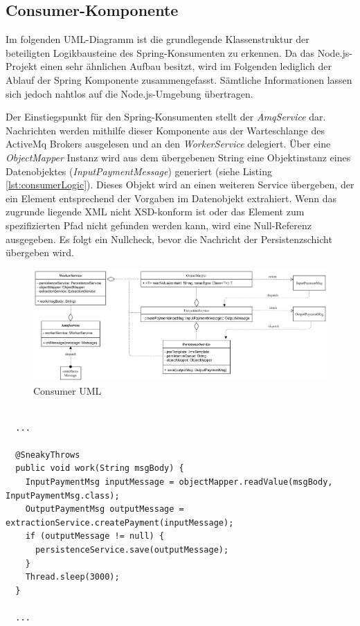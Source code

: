 \subsection{Consumer-Komponente}

Im folgenden UML-Diagramm ist die grundlegende Klassenstruktur der beteiligten Logikbausteine des Spring-Konsumenten zu erkennen. Da das Node.js-Projekt einen sehr ähnlichen Aufbau besitzt, wird im Folgenden lediglich der Ablauf der Spring Komponente zusammengefasst. Sämtliche Informationen lassen sich jedoch nahtlos auf die Node.js-Umgebung übertragen. 

Der Einstiegspunkt für den Spring-Konsumenten stellt der \emph{AmqService} dar. Nachrichten werden mithilfe dieser Komponente aus der Warteschlange des ActiveMq Brokers ausgelesen und an den \emph{WorkerService} delegiert. Über eine \emph{ObjectMapper} Instanz wird aus dem übergebenen String eine Objektinstanz eines Datenobjektes (\emph{InputPaymentMessage}) generiert (siehe Listing \ref{lst:consumerLogic}). Dieses Objekt wird an einen weiteren Service übergeben, der ein Element entsprechend der Vorgaben im Datenobjekt extrahiert. Wenn das zugrunde liegende XML nicht XSD-konform ist oder das Element zum spezifizierten Pfad nicht gefunden werden kann, wird eine Null-Referenz ausgegeben. Es folgt ein Nullcheck, bevor die Nachricht der Persistenzschicht übergeben wird.

\begin{figure}[b!]
	\centering
	\includegraphics[width=\linewidth]{kapitel/problemloesung/implementierung/_img/consumer-uml}
	\caption[Consumer UML]{Consumer UML}
	\label{fig:consumerUml}
\end{figure}

\begin{minipage}{\linewidth}
\begin{lstlisting}[style=javaStyle,caption={WorkerService - Consumer Logik},label=lst:consumerLogic]

  ...

  @SneakyThrows
  public void work(String msgBody) {
    InputPaymentMsg inputMessage = objectMapper.readValue(msgBody, InputPaymentMsg.class);
    OutputPaymentMsg outputMessage = extractionService.createPayment(inputMessage);
    if (outputMessage != null) {
      persistenceService.save(outputMessage);
    }
    Thread.sleep(3000);
  }

  ...

\end{lstlisting}
\end{minipage}

